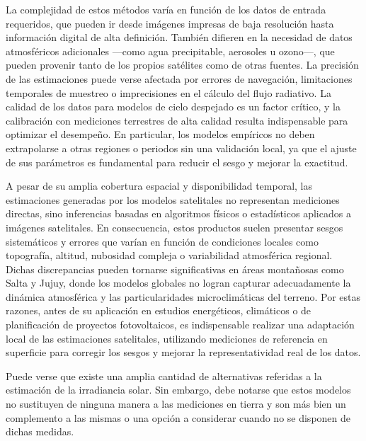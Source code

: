 \documentclass[letterpaper,12pt, twoside]{report}
\providecommand{\DIFdeltex}[1]{{\protect\color{red} \scriptsize #1}} %
\providecommand{\DIFdel}[1]{\texorpdfstring{\DIFdeltex{#1}}{}} %
\begin{document}
\DIFdel{La complejidad de estos métodos varía en función de los datos de entrada requeridos, que pueden ir desde imágenes impresas de baja resolución hasta información digital de alta definición. También difieren en la necesidad de datos atmosféricos adicionales —como agua precipitable, aerosoles u ozono—, que pueden provenir tanto de los propios satélites como de otras fuentes. La precisión de las estimaciones puede verse afectada por errores de navegación, limitaciones temporales de muestreo o imprecisiones en el cálculo del flujo radiativo. La calidad de los datos para modelos de cielo despejado es un factor crítico, y la calibración con mediciones terrestres de alta calidad resulta indispensable para optimizar el desempeño. En particular, los modelos empíricos no deben extrapolarse a otras regiones o periodos sin una validación local, ya que el ajuste de sus parámetros es fundamental para reducir el sesgo y mejorar la exactitud.
}%

\DIFdel{A pesar de su amplia cobertura espacial y disponibilidad temporal, las estimaciones generadas por los modelos satelitales no representan mediciones directas, sino inferencias basadas en algoritmos físicos o estadísticos aplicados a imágenes satelitales. En consecuencia, estos productos suelen presentar sesgos sistemáticos y errores que varían en función de condiciones locales como topografía, altitud, nubosidad compleja o variabilidad atmosférica regional. Dichas discrepancias pueden tornarse significativas en áreas montañosas como Salta y Jujuy, donde los modelos globales no logran capturar adecuadamente la dinámica atmosférica y las particularidades microclimáticas del terreno. Por estas razones, antes de su aplicación en estudios energéticos, climáticos o de planificación de proyectos fotovoltaicos, es indispensable realizar una adaptación local de las estimaciones satelitales, utilizando mediciones de referencia en superficie para corregir los sesgos y mejorar la representatividad real de los datos.}%

\DIFdel{Puede verse que existe una amplia cantidad de alternativas referidas a la estimación de la irradiancia solar. Sin embargo, debe notarse que estos modelos no sustituyen de ninguna manera a las mediciones en tierra y son más bien un complemento a las mismas o una opción a considerar cuando no se disponen de dichas medidas. 
}%

\end{document}

